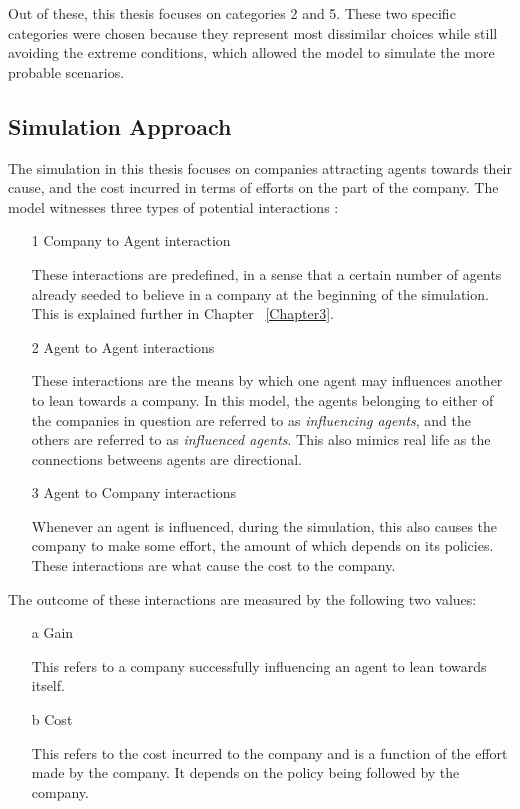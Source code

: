 Out of these, this thesis focuses on categories 2 and 5.
These two specific categories were chosen because they represent most dissimilar choices while still avoiding the extreme conditions, which allowed the model to simulate the more probable scenarios.

\subsection{Simulation Approach}

The simulation in this thesis focuses on companies attracting agents towards their cause, and the cost incurred in terms of efforts on the part of the company.
The model witnesses three types of potential interactions : 
\begin{enumerate}
\item[1] Company to Agent interaction 

These interactions are predefined, in a sense that a certain number of agents already seeded to believe in a company at the beginning of the simulation. This is explained further in Chapter ~\ref{Chapter3}.

\item[2] Agent to Agent interactions

These interactions are the means by which one agent may influences another to lean towards a company. In this model, the agents belonging to either of the companies in question are referred to as  \emph{influencing agents}, and the others are referred to as \emph{influenced agents}. This also mimics real life as the connections betweens agents are directional.

\item[3] Agent to Company interactions

Whenever an agent is influenced, during the simulation, this also causes the company to make some effort, the amount of which depends on its policies. These interactions are what cause the cost to the company.


\end{enumerate}

The outcome of these interactions are measured by the following two values:

\begin{enumerate}
\item[a] Gain

This refers to a company successfully influencing an agent to lean towards itself.

\item[b] Cost

This refers to the cost incurred to the company and is a function of the effort made by the company. It depends on the policy being followed by the company.
\end{enumerate}
	






